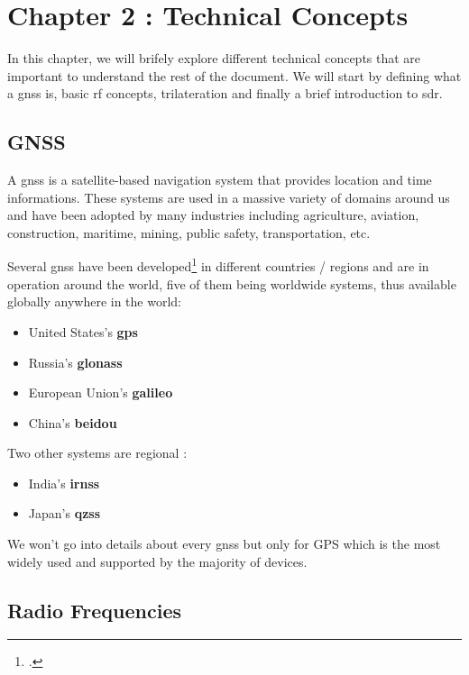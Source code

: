 
\chapter{Chapter 2 : Technical Concepts}

In this chapter, we will brifely explore different technical concepts that are important to understand the rest of the document. We will start by defining what a \gls{gnss} is, basic \gls{rf} concepts, trilateration and finally a brief introduction to \gls{sdr}.


\section{GNSS}

A \gls{gnss} is a satellite-based navigation system that provides location and time informations. These systems are used in a massive variety of domains around us and have been adopted by many industries including agriculture, aviation, construction, maritime, mining, public safety, transportation, etc.

Several \gls{gnss} have been developed\footcite{noauthor_satellite_2024} in different countries / regions and are in operation around the world, five of them being worldwide systems, thus available globally anywhere in the world:

\begin{itemize}
	\item United States's \textbf{\gls{gps}}
	\item Russia's \textbf{\gls{glonass}}
	\item European Union's \textbf{\gls{galileo}}
	\item China's \textbf{\gls{beidou}}
\end{itemize}

Two other systems are regional :
\begin{itemize}
	\item India's \textbf{\gls{irnss}}
	\item Japan's \textbf{\gls{qzss}}
\end{itemize}

We won't go into details about every \gls{gnss} but only for GPS which is the most widely used and supported by the majority of devices.

\section{Radio Frequencies}

